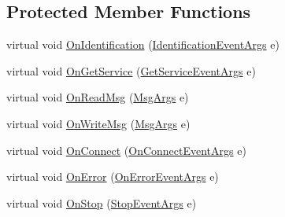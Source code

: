 \subsection*{Protected Member Functions}
\begin{DoxyCompactItemize}
\item 
virtual void \mbox{\hyperlink{class_n_t_k_1_1_n_t_k_client_a19d5e13ab370aacc08bf182d03299e10}{On\+Identification}} (\mbox{\hyperlink{class_n_t_k_1_1_events_args_1_1_identification_event_args}{Identification\+Event\+Args}} e)
\item 
virtual void \mbox{\hyperlink{class_n_t_k_1_1_n_t_k_client_a8f6d37201457e568450d6d11e14ecb20}{On\+Get\+Service}} (\mbox{\hyperlink{class_n_t_k_1_1_events_args_1_1_get_service_event_args}{Get\+Service\+Event\+Args}} e)
\item 
virtual void \mbox{\hyperlink{class_n_t_k_1_1_n_t_k_client_a815bd21dd5aaf772cb1d0cfd1b951f53}{On\+Read\+Msg}} (\mbox{\hyperlink{class_n_t_k_1_1_events_args_1_1_msg_args}{Msg\+Args}} e)
\item 
virtual void \mbox{\hyperlink{class_n_t_k_1_1_n_t_k_client_a628b48cd759c2d4424e9877bc64e1581}{On\+Write\+Msg}} (\mbox{\hyperlink{class_n_t_k_1_1_events_args_1_1_msg_args}{Msg\+Args}} e)
\item 
virtual void \mbox{\hyperlink{class_n_t_k_1_1_n_t_k_client_a7b8bf5bfbfe89d792c2378386a86fa44}{On\+Connect}} (\mbox{\hyperlink{class_n_t_k_1_1_events_args_1_1_on_connect_event_args}{On\+Connect\+Event\+Args}} e)
\item 
virtual void \mbox{\hyperlink{class_n_t_k_1_1_n_t_k_client_a90d864509292129f091e6efe9690391a}{On\+Error}} (\mbox{\hyperlink{class_n_t_k_1_1_events_args_1_1_on_error_event_args}{On\+Error\+Event\+Args}} e)
\item 
virtual void \mbox{\hyperlink{class_n_t_k_1_1_n_t_k_client_a66275e4bc70f86f6a1db11984efbbf51}{On\+Stop}} (\mbox{\hyperlink{class_n_t_k_1_1_events_args_1_1_stop_event_args}{Stop\+Event\+Args}} e)
\end{DoxyCompactItemize}
